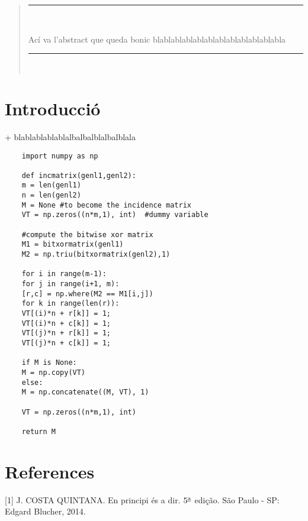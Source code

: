 \documentclass[aps,prl,reprint]{revtex4-1}
\begin{document}
	
	
	\author{Team number: 891\\ Problem A\\Aquí va el títol}
	
	\begin{abstract}
		
		\begin{center}
			
			\rule{15cm}{1pt} \\
			
		\end{center}
		
		Ací va l'abstract que queda bonic blablablablablablablablablablablabla
		\begin{center}
			
			\rule{15cm}{1pt} \\
			
		\end{center}
		
	\end{abstract}
	
	\maketitle
	\onecolumngrid\newpage\twocolumngrid
	\section{Introducció}
	+ blablablablablalbalbalblalbalblala
	
	\begin{verbatim}
	import numpy as np
	
	def incmatrix(genl1,genl2):
	m = len(genl1)
	n = len(genl2)
	M = None #to become the incidence matrix
	VT = np.zeros((n*m,1), int)  #dummy variable
	
	#compute the bitwise xor matrix
	M1 = bitxormatrix(genl1)
	M2 = np.triu(bitxormatrix(genl2),1) 
	
	for i in range(m-1):
	for j in range(i+1, m):
	[r,c] = np.where(M2 == M1[i,j])
	for k in range(len(r)):
	VT[(i)*n + r[k]] = 1;
	VT[(i)*n + c[k]] = 1;
	VT[(j)*n + r[k]] = 1;
	VT[(j)*n + c[k]] = 1;
	
	if M is None:
	M = np.copy(VT)
	else:
	M = np.concatenate((M, VT), 1)
	
	VT = np.zeros((n*m,1), int)
	
	return M
	\end{verbatim}
	\section{References}
	[1] J. COSTA QUINTANA. En principi és a dir. $5{\textsuperscript{\underline{a}}}$ edição. São Paulo - SP: Edgard Blucher, 2014. 
	
	
	
	
	
	
\end{document}
